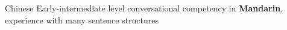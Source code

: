 \begin{cvskills}
 




\cvskill
   {Chinese} %
   {Early-intermediate level conversational competency in \textbf{Mandarin}, experience with many sentence structures   } %



\end{cvskills}

